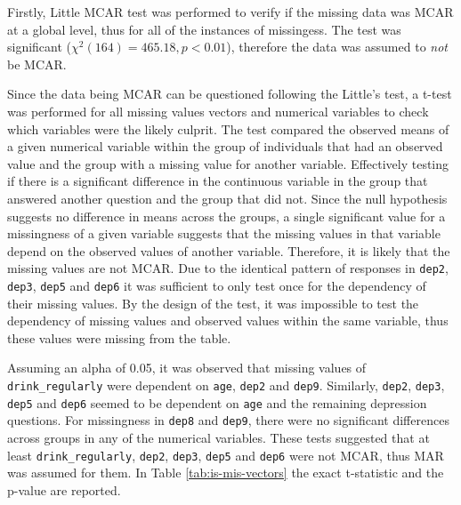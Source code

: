 \documentclass[
]{article}
\begin{document}
Firstly, Little MCAR test was performed to verify if the missing data was MCAR at a global level, thus for all of the instances of missingess. The test was significant (\(\chi^2 (164) = 465.18, p < 0.01\)), therefore the data was assumed to \emph{not} be MCAR.

Since the data being MCAR can be questioned following the Little's test, a t-test was performed for all missing values vectors and numerical variables to check which variables were the likely culprit. The test compared the observed means of a given numerical variable within the group of individuals that had an observed value and the group with a missing value for another variable. Effectively testing if there is a significant difference in the continuous variable in the group that answered another question and the group that did not. Since the null hypothesis suggests no difference in means across the groups, a single significant value for a missingness of a given variable suggests that the missing values in that variable depend on the observed values of another variable. Therefore, it is likely that the missing values are not MCAR. Due to the identical pattern of responses in \texttt{dep2}, \texttt{dep3}, \texttt{dep5} and \texttt{dep6} it was sufficient to only test once for the dependency of their missing values. By the design of the test, it was impossible to test the dependency of missing values and observed values within the same variable, thus these values were missing from the table.

Assuming an alpha of 0.05, it was observed that missing values of \texttt{drink\_regularly} were dependent on \texttt{age}, \texttt{dep2} and \texttt{dep9}. Similarly, \texttt{dep2}, \texttt{dep3}, \texttt{dep5} and \texttt{dep6} seemed to be dependent on \texttt{age} and the remaining depression questions. For missingness in \texttt{dep8} and \texttt{dep9}, there were no significant differences across groups in any of the numerical variables. These tests suggested that at least \texttt{drink\_regularly}, \texttt{dep2}, \texttt{dep3}, \texttt{dep5} and \texttt{dep6} were not MCAR, thus MAR was assumed for them. In Table \ref{tab:is-mis-vectors} the exact t-statistic and the p-value are reported.
\end{document}
